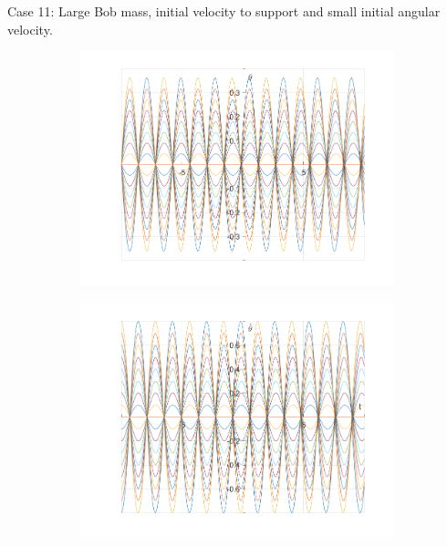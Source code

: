 \documentclass{article}
\begin{document}
	Case 11:
	Large Bob mass, initial velocity to support and small initial angular velocity.
	\begin{figure}[h!]
		\centering
		\begin{subfigure}[b]{0.48\linewidth}
			\includegraphics[width=\linewidth]{./SmallOscillations/S11/F1.png}
		\end{subfigure}
		\begin{subfigure}[b]{0.48\linewidth}
			\includegraphics[width=\linewidth]{./SmallOscillations/S11/F2.png}
		\end{subfigure}
	\end{figure}
	
\end{document}
